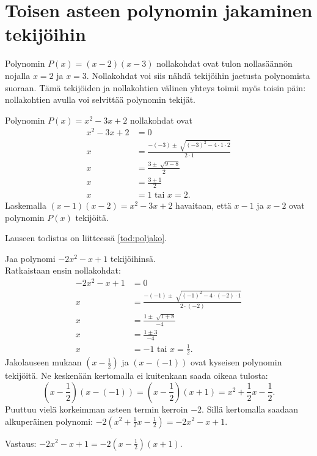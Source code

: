 \section{Toisen asteen polynomin jakaminen tekijöihin}


Polynomin $P(x)=(x-2)(x-3)$ nollakohdat ovat tulon nollasäännön nojalla $x=2$ ja $x=3$. Nollakohdat voi siis nähdä tekijöihin jaetusta polynomista suoraan. Tämä tekijöiden ja nollakohtien välinen yhteys toimii myös toisin päin: nollakohtien avulla voi selvittää polynomin tekijät.

\begin{esimerkki}
Polynomin $P(x)=x^2-3x+2$ nollakohdat ovat
\begin{align*}
x^2-3x+2&=0 \\
x&=\frac{-(-3) \pm \sqrt[]{(-3)^2-4 \cdot 1 \cdot 2}}{2 \cdot 1} \\
x&=\frac{3 \pm \sqrt[]{9-8}}{2} \\
x&=\frac{3 \pm 1}{2} \\
x&=1 \textrm{ tai } x = 2.
\end{align*}
Laskemalla $(x-1)(x-2)=x^2-3x+2$ havaitaan, että $x-1$ ja $x-2$ ovat
polynomin $P(x)$ tekijöitä.
\end{esimerkki}


Lauseen todistus on liitteessä \ref{tod:poljako}.

\begin{esimerkki}
Jaa polynomi $-2x^2-x+1$ tekijöihinsä.\\
Ratkaistaan ensin nollakohdat:
\begin{align*}
-2x^2-x+1&=0 \\
x&=\frac{-(-1) \pm \sqrt[]{(-1)^2-4 \cdot (-2) \cdot 1}}{2 \cdot (-2)} \\
x&=\frac{1 \pm \sqrt[]{1+8}}{-4} \\
x&=\frac{1 \pm 3}{-4} \\
x&=-1 \textrm{ tai } x = \frac{1}{2}.
\end{align*}
Jakolauseen mukaan $(x-\frac{1}{2})$ ja $(x-(-1))$ ovat kyseisen polynomin tekijöitä.
Ne keskenään kertomalla ei kuitenkaan saada oikeaa tulosta:
$$\left(x-\frac{1}{2}\right)(x-(-1))=\left(x-\frac{1}{2}\right)(x+1)=x^2+\frac{1}{2}x-\frac{1}{2}.$$
Puuttuu vielä korkeimman asteen termin kerroin $-2$. Sillä kertomalla saadaan alkuperäinen polynomi:
$-2(x^2+\frac{1}{2}x-\frac{1}{2})=-2x^2-x+1$.

Vastaus: $-2x^2-x+1 = -2(x-\frac{1}{2})(x+1)$.
\end{esimerkki}

